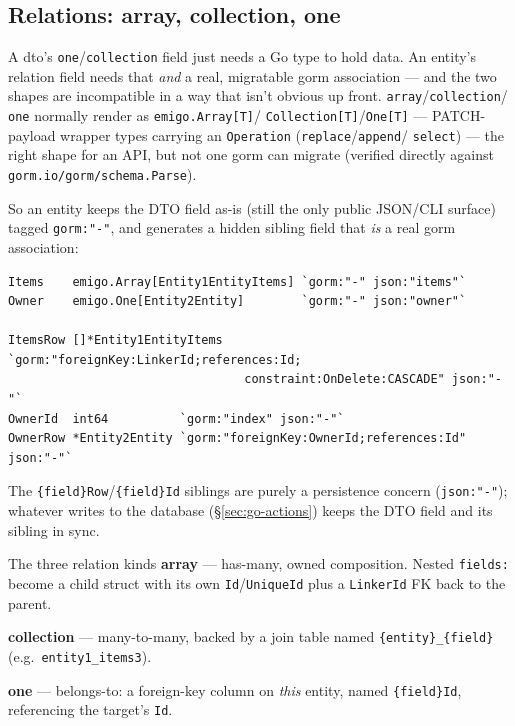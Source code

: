 \subsection{Relations: array, collection, one}
\label{sec:go-relations}

A dto's \texttt{one}/\texttt{collection} field just needs a Go type to
hold data. An entity's relation field needs that \emph{and} a real,
migratable gorm association --- and the two shapes are incompatible in a
way that isn't obvious up front. \texttt{array}/\texttt{collection}/
\texttt{one} normally render as \texttt{emigo.Array[T]}/
\texttt{Collection[T]}/\texttt{One[T]} --- PATCH-payload wrapper types
carrying an \texttt{Operation} (\texttt{replace}/\texttt{append}/
\texttt{select}) --- the right shape for an API, but not one gorm can
migrate (verified directly against \texttt{gorm.io/gorm/schema.Parse}).

So an entity keeps the DTO field as-is (still the only public JSON/CLI
surface) tagged \texttt{gorm:"-"}, and generates a hidden sibling field
that \emph{is} a real gorm association:

\begin{lstlisting}
Items    emigo.Array[Entity1EntityItems] `gorm:"-" json:"items"`
Owner    emigo.One[Entity2Entity]        `gorm:"-" json:"owner"`

ItemsRow []*Entity1EntityItems `gorm:"foreignKey:LinkerId;references:Id;
                                 constraint:OnDelete:CASCADE" json:"-"`
OwnerId  int64          `gorm:"index" json:"-"`
OwnerRow *Entity2Entity `gorm:"foreignKey:OwnerId;references:Id" json:"-"`
\end{lstlisting}
The \texttt{\{field\}Row}/\texttt{\{field\}Id} siblings are purely a
persistence concern (\texttt{json:"-"}); whatever writes to the database
(\S\ref{sec:go-actions}) keeps the DTO field and its sibling in sync.

\begin{sidebar}{The three relation kinds}
\textbf{array} --- has-many, owned composition. Nested \texttt{fields:}
become a child struct with its own \texttt{Id}/\texttt{UniqueId} plus a
\texttt{LinkerId} FK back to the parent.

\textbf{collection} --- many-to-many, backed by a join table named
\texttt{\{entity\}\_\{field\}} (e.g.\ \texttt{entity1\_items3}).

\textbf{one} --- belongs-to: a foreign-key column on \emph{this} entity,
named \texttt{\{field\}Id}, referencing the target's \texttt{Id}.
\end{sidebar}

